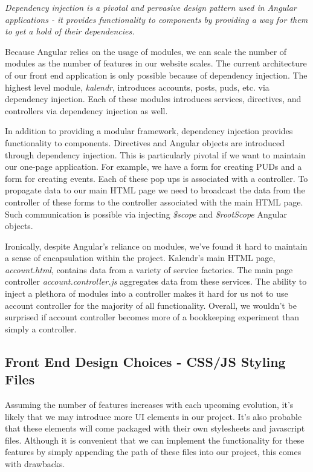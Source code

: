 \documentclass[a4paper]{article}
\begin{document}
\begin{center}
\textit{Dependency injection is a pivotal and pervasive design pattern used in Angular applications - it provides functionality to components by providing a way for them to get a hold of their dependencies.}
\end{center}

Because Angular relies on the usage of modules, we can scale the number of modules as the number of features in our website scales. The current architecture of our front end application is only possible because of dependency injection. The highest level module, \textit{kalendr}, introduces accounts, posts, puds, etc. via dependency injection. Each of these modules introduces services, directives, and controllers via dependency injection as well.

In addition to providing a modular framework, dependency injection provides functionality to components. Directives and Angular objects are introduced through dependency injection. This is particularly pivotal if we want to maintain our one-page application. For example, we have a form for creating PUDs and a form for creating events. Each of these pop ups is associated with a controller. To propagate data to our main HTML page we need to broadcast the data from the controller of these forms to the controller associated with the main HTML page. Such communication is possible via injecting \textit{\$scope} and \textit{\$rootScope} Angular objects.

Ironically, despite Angular's reliance on modules, we've found it hard to maintain a sense of encapsulation within the project. Kalendr's main HTML page, \textit{account.html}, contains data from a variety of service factories. The main page controller \textit{account.controller.js} aggregates data from these services. The ability to inject a plethora of modules into a controller makes it hard for us not to use account controller for the majority of all functionality. Overall, we wouldn't be surprised if account controller becomes more of a bookkeeping experiment than simply a controller.

\subsection{Front End Design Choices - CSS/JS Styling Files}

Assuming the number of features increases with each upcoming evolution, it's likely that we may introduce more UI elements in our project. It's also probable that these elements will come packaged with their own stylesheets and javascript files. Although it is convenient that we can implement the functionality for these features by simply appending the path of these files into our project, this comes with drawbacks. 
\end{document}

